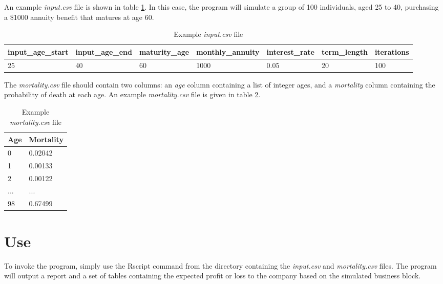 \documentclass[12pt]{article}
\begin{document}
An example \textit{input.csv} file is shown in table \ref{example}. In this case, the program will simulate a group of 100 individuals, aged 25 to 40, purchasing a \$1000 annuity benefit that matures at age 60. 


\begin{table}[H]
	\begin{adjustwidth}{-.5in}{-.5in}  
		\begin{tabular}{|l|l|l|l|l|l|l|}
			\hline
			input\_age\_start & input\_age\_end & maturity\_age & monthly\_annuity & interest\_rate & term\_length & iterations \\ \hline
			25 & 40 & 60 & 1000 & 0.05 & 20 & 100 \\ \hline
		\end{tabular}
		\label{example}
		\caption{Example \textit{input.csv} file}
	\end{adjustwidth}
\end{table}

The \textit{mortality.csv} file should contain two columns: an \textit{age} column containing a list of integer ages, and a \textit{mortality} column containing the probability of death at each age. An example \textit{mortality.csv} file is given in table \ref{mortality}. 

\begin{table}[H]
	\centering
	\begin{tabular}{|l|l|}
		\hline
		Age & Mortality \\ \hline
		0 & 0.02042 \\ \hline
		1 & 0.00133 \\ \hline
		2 & 0.00122 \\ \hline
		... & ... \\ \hline
		98 & 0.67499 \\ \hline
	\end{tabular}
	\caption{Example \textit{mortality.csv} file}
	\label{mortality}
\end{table}

\section{Use}

To invoke the program, simply use the Rscript command from the directory containing the \textit{input.csv} and \textit{mortality.csv} files. The program will output a report and a set of tables containing the expected profit or loss to the company based on the simulated business block. 
\end{document}
